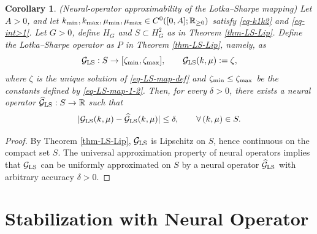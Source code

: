 \documentclass[journal,twoside,web]{ieeecolor}
\newtheorem{corollary}{Corollary}
\begin{document}
\begin{corollary} \emph{(Neural-operator approximability of the Lotka--Sharpe mapping)} %
Let $A>0$, and let $k_{\rm min},k_{\rm max},\mu_{\rm min},\mu_{\rm max}\in C^0([0,A];\mathbb R_{\ge 0})$ satisfy \eqref{eq-k1k2} and \eqref{eq-int>1}. 
Let $G>0$, define $H_G$ and $S\subset H_G^2$ as in Theorem \ref{thm-LS-Lip}.
Define the Lotka--Sharpe operator as $P$ in Theorem \ref{thm-LS-Lip}, namely, as
\begin{equation}
\mathcal{G}_{\rm LS}:S\to[\zeta_{\rm min},\zeta_{\rm max}],\qquad \mathcal{G}_{\rm LS}(k,\mu):=\zeta,
\end{equation}
where $\zeta$ is the unique solution of \eqref{eq-LS-map-def} and $\zeta_{\rm \min} \leq \zeta_{\rm max}$ be the constants defined by \eqref{eq-LS-map-1-2}.
Then, for every $\delta>0$, there exists a neural operator $\widehat{\mathcal{G}}_{\rm LS}:S\to\mathbb R$ such that
\begin{equation}
|\mathcal{G}_{\rm LS}(k,\mu)-\widehat{\mathcal{G}}_{\rm LS}(k,\mu)|\le \delta,\qquad \forall\,(k,\mu)\in S.
\end{equation}
\end{corollary}

\begin{proof}
By Theorem \ref{thm-LS-Lip}, $\mathcal{G}_{\rm LS}$ is Lipschitz on $S$, hence continuous on the compact set $S$. The universal approximation property of neural operators \cite{lu2021Learning} implies that $\mathcal{G}_{\rm LS}$ can be uniformly approximated on $S$ by a neural operator $\widehat{\mathcal{G}}_{\rm LS}$ with arbitrary accuracy $\delta>0$.
\end{proof}

\section{Stabilization with Neural Operator}
\label{sec-stabilization}
\end{document}
